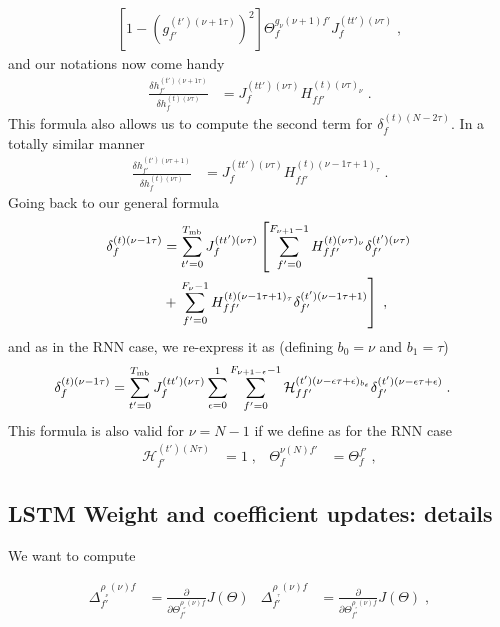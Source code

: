 \begin{subappendices}
\begin{align}
%
\left[1-  \left(g^{(t')(\nu+1\tau)}_{f'}\right)^2\right]\Theta^{g_\nu(\nu+1)f'}_{f}
%
J^{(tt')(\nu\tau)}_f\;,
\end{align}
and our notations now come handy
\begin{align}
\frac{\delta h^{(t')(\nu+1\tau)}_{f'}}{\delta h^{(t)(\nu\tau)}_f }&=J^{(tt')(\nu\tau)}_fH^{(t)(\nu\tau)_\nu}_{ff'}\;.
\end{align}
This formula also allows us to compute the second term for $\delta^{(t)(N-2\tau)}_f$. In a totally similar manner
\begin{align}
\frac{\delta h^{(t')(\nu\tau+1)}_{f'}}{\delta h^{(t)(\nu\tau)}_f }&=J^{(tt')(\nu\tau)}_fH^{(t)(\nu-1\tau+1)_\tau}_{ff'}\;.
\end{align}
Going back to our general formula
\begin{align}
\delta^{(t)(\nu-1\tau)}_f&= \sum_{t'=0}^{T_{{\rm mb}}}J^{(tt')(\nu\tau)}_f\left[\sum_{f'=0}^{F_{\nu+1}-1}
%
H^{(t)(\nu\tau)_\nu}_{ff'}\delta^{(t')(\nu\tau)}_{f'}\right.\notag\\
%
&+\left.\sum_{f'=0}^{F_{\nu}-1}H^{(t)(\nu-1\tau+1)_\tau}_{ff'}\delta^{(t')(\nu-1\tau+1)}_{f'}\right]\;,
\end{align}
and as in the RNN case, we re-express it as (defining $b_0=\nu$ and $b_1=\tau$)
\begin{align}
\delta^{(t)(\nu-1\tau)}_f&= 
%
\sum_{t'=0}^{T_{{\rm mb}}}J^{(tt')(\nu\tau)}_f\sum_{\epsilon=0}^{1}\sum_{f'=0}^{F_{\nu+1-\epsilon}-1}
%
\mathcal{H}^{(t')(\nu-\epsilon\tau+\epsilon)_{b_\epsilon}}_{ff'}\delta^{(t')(\nu-\epsilon\tau+\epsilon)}_{f'}\;.
\end{align}
This formula is also valid for $\nu  =N-1$ if we define as for the RNN case
\begin{align}
\mathcal{H}^{(t')(N\tau)}_{f'}&=1\;,&
%
\Theta^{\nu(N)f'}_{f}&=\Theta^{f'}_{f}\;,
\end{align}
 


\subsection{LSTM Weight and coefficient updates: details}

We want to compute 

\begin{align}
\Delta^{\rho_{_\nu}(\nu)f}_{f'}&=\frac{\partial}{\partial \Theta^{\rho_{_\nu}(\nu)f}_{f'}} J(\Theta)&
%
\Delta^{\rho_{_\tau}(\nu)f}_{f'}&=\frac{\partial}{\partial \Theta^{\rho_{_\tau}(\nu)f}_{f'}} J(\Theta)\;,
\end{align}


\end{subappendices}
